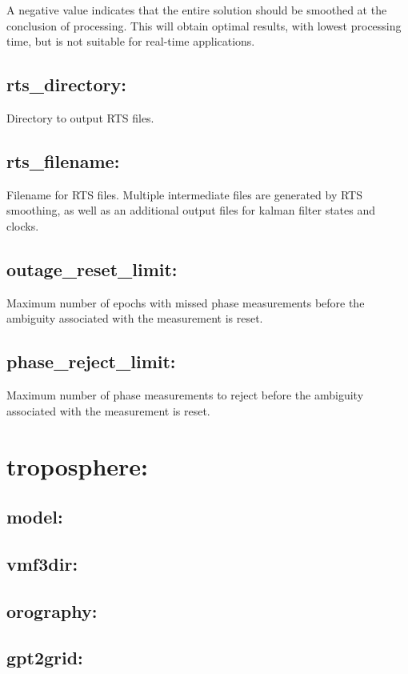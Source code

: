 A negative value indicates that the entire solution should be smoothed at the conclusion of processing. This will obtain optimal results, with lowest processing time, but is not suitable for real-time applications.

\subsection{rts\_directory:}
Directory to output RTS files.

\subsection{rts\_filename:}
Filename for RTS files. Multiple intermediate files are generated by RTS smoothing, as well as an additional output files for kalman filter states and clocks.

\subsection{outage\_reset\_limit:}
Maximum number of epochs with missed phase measurements before the ambiguity associated with the measurement is reset.

\subsection{phase\_reject\_limit:}
Maximum number of phase measurements to reject before the ambiguity associated with the measurement is reset.




\section{troposphere:}

\subsection{model:}

\subsection{vmf3dir:}

\subsection{orography:}

\subsection{gpt2grid:}




